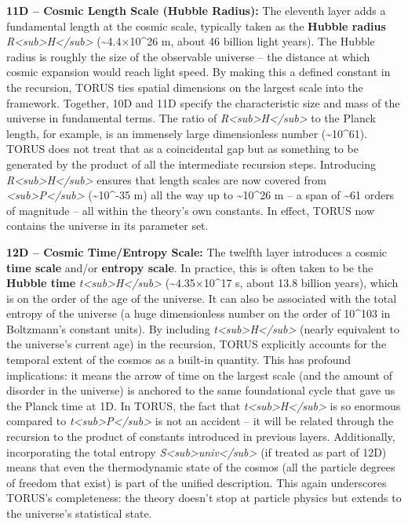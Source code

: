 \documentclass[
]{article}
\begin{document}
\textbf{11D -- Cosmic Length Scale (Hubble Radius):} The eleventh layer
adds a fundamental length at the cosmic scale, typically taken as the
\textbf{Hubble radius}
\emph{R\textless sub\textgreater H\textless/sub\textgreater{}}
(\textasciitilde4.4×10\^{}26 m, about 46 billion light years). The
Hubble radius is roughly the size of the observable universe -- the
distance at which cosmic expansion would reach light speed. By making
this a defined constant in the recursion, TORUS ties spatial dimensions
on the largest scale into the framework. Together, 10D and 11D specify
the characteristic size and mass of the universe in fundamental terms.
The ratio of
\emph{R\textless sub\textgreater H\textless/sub\textgreater{}} to the
Planck length, for example, is an immensely large dimensionless number
(\textasciitilde10\^{}61). TORUS does not treat that as a coincidental
gap but as something to be generated by the product of all the
intermediate recursion steps. Introducing
\emph{R\textless sub\textgreater H\textless/sub\textgreater{}} ensures
that length scales are now covered from
\emph{\ell\textless sub\textgreater P\textless/sub\textgreater{}}
(\textasciitilde10\^{}-35 m) all the way up to \textasciitilde10\^{}26 m
-- a span of \textasciitilde61 orders of magnitude -- all within the
theory's own constants. In effect, TORUS now contains the universe in
its parameter set.

\textbf{12D -- Cosmic Time/Entropy Scale:} The twelfth layer introduces
a cosmic \textbf{time scale} and/or \textbf{entropy scale}. In practice,
this is often taken to be the \textbf{Hubble time}
\emph{t\textless sub\textgreater H\textless/sub\textgreater{}}
(\textasciitilde4.35×10\^{}17 s, about 13.8 billion years), which is on
the order of the age of the universe. It can also be associated with the
total entropy of the universe (a huge dimensionless number on the order
of 10\^{}103 in Boltzmann's constant units). By including
\emph{t\textless sub\textgreater H\textless/sub\textgreater{}} (nearly
equivalent to the universe's current age) in the recursion, TORUS
explicitly accounts for the temporal extent of the cosmos as a built-in
quantity. This has profound implications: it means the arrow of time on
the largest scale (and the amount of disorder in the universe) is
anchored to the same foundational cycle that gave us the Planck time at
1D. In TORUS, the fact that
\emph{t\textless sub\textgreater H\textless/sub\textgreater{}} is so
enormous compared to
\emph{t\textless sub\textgreater P\textless/sub\textgreater{}} is not an
accident -- it will be related through the recursion to the product of
constants introduced in previous layers. Additionally, incorporating the
total entropy
\emph{S\textless sub\textgreater univ\textless/sub\textgreater{}} (if
treated as part of 12D) means that even the thermodynamic state of the
cosmos (all the particle degrees of freedom that exist) is part of the
unified description. This again underscores TORUS's completeness: the
theory doesn't stop at particle physics but extends to the universe's
statistical state.
\end{document}
